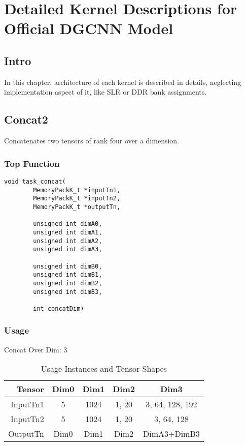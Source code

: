 
\chapter{Detailed Kernel Descriptions for Official DGCNN Model}

\section{Intro}
In this chapter, architecture of each kernel is described in details, neglecting implementation aspect of it, like SLR or DDR bank assignments.

\pagebreak

\section{Concat2}
Concatenates two tensors of rank four over a dimension.
\subsection{Top Function}
\begin{lstlisting}
void task_concat(
		MemoryPackK_t *inputTn1,
		MemoryPackK_t *inputTn2,
		MemoryPackK_t *outputTn,
		
		unsigned int dimA0,
		unsigned int dimA1,
		unsigned int dimA2,
		unsigned int dimA3,
		
		unsigned int dimB0,
		unsigned int dimB1,
		unsigned int dimB2,
		unsigned int dimB3,
		
		int concatDim)
\end{lstlisting}

\subsection{Usage}
Concat Over Dim: 3
\vspace{0.5cm}
\begin{table}[htbp] %
\caption{Usage Instances and Tensor Shapes}
\label{tab:shapes_concat}
	\begin{center}
		\begin{tabular}{|r|c|c|c|c|} 
		\hline	
		Tensor & Dim0 & Dim1 & Dim2 & Dim3\\ 
		\hline	
		InputTn1 &
			5 &
			1024 &
			1, 20 &
			3, 64, 128, 192 \\ 
		\hline
		InputTn2 &
			5 & 
			1024 & 
			1, 20 & 
			3, 64, 128 \\
		\hline
		OutputTn &
			Dim0 & 
			Dim1 & 
			Dim2 & 
			DimA3+DimB3 \\
		\hline
		\end{tabular}
	\end{center}
\end{table}

